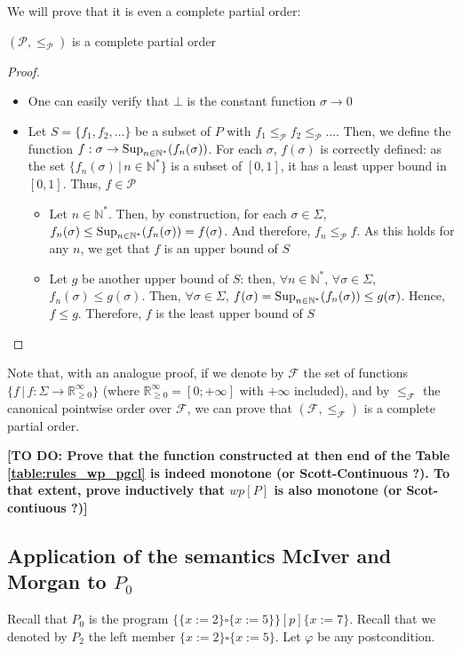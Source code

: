 \documentclass[a4paper,10pt]{llncs}
\def\NN {{\mathbb N}}
\def\RRposi {{\mathbb R_{\geq 0}^{\infty}}}
\def\Sup {\textnormal {Sup}}
\newcommand\todo[1]{{\color{red}\textbf{[TO DO:  #1]}}}
\begin{document}
We will prove that it is even a complete partial order:
\begin{theorem}
$(\mathcal{P},\leq_{\mathcal{P}})$ is a complete partial order
\end{theorem}
\begin{proof}
\begin{itemize}
\item One can easily verify that $\bot$ is the constant function $\sigma \rightarrow 0$
\item Let $S = \{f_1, f_2, \dots \}$ be a subset of $P$ with $f_1 \leq_{\mathcal{P}} f_2 \leq_{\mathcal{P}} \dots$. Then, we define the function $f : \sigma \rightarrow \Sup_{n \in \NN^*}(f_n(\sigma))$. \newline
For each $\sigma$, $f(\sigma)$ is correctly defined: as the set $\{f_n(\sigma) \,|\, n \in \NN^*\}$ is a  subset of $[0,1]$, it has a least upper bound in $[0,1]$. Thus, $f \in \mathcal{P}$
\begin{itemize}
\item Let $n \in \NN^*$. Then, by construction, for each $\sigma \in \Sigma$, $f_n(\sigma) \leq \Sup_{n \in \NN^*}(f_n(\sigma)) = f(\sigma)$. And therefore, $f_n \leq_{\mathcal{P}} f$. As this holds for any $n$, we get that $f$ is an upper bound of $S$
\item Let $g$ be another upper bound of $S$: then, $\forall n \in \NN^*$, $\forall \sigma \in \Sigma$, $f_n(\sigma) \leq g(\sigma)$. Then, $\forall \sigma \in \Sigma$, $f(\sigma) = \Sup_{n \in \NN^*}(f_n(\sigma)) \leq g(\sigma)$. Hence, $f \leq g$. Therefore, $f$ is the least upper bound of $S$
\end{itemize}
\end{itemize}
\end{proof}
 
 Note that, with an analogue proof, if we denote by $\mathcal{F}$ the set of functions $\{f \,|\, f : \Sigma \rightarrow \RRposi\}$ (where $\RRposi = [0;+\infty]$ with $+\infty$ included), and by $\leq_{\mathcal{F}}$ the canonical pointwise order over $\mathcal{F}$, we can prove that $(\mathcal{F},\leq_{\mathcal{F}})$ is a complete partial order.
 
\todo{Prove that the function constructed at then end of the Table \ref{table:rules_wp_pgcl} is indeed monotone (or Scott-Continuous ?). To that extent, prove inductively that $wp[P]$ is also monotone (or Scot-contiuous ?)}

\subsection{Application of the semantics McIver and Morgan to $P_0$}
\label{subsec:wp_p0}
Recall that $P_0$ is the program $\{ \{x := 2\} \square \{x := 5\} \} [p] \{ x := 7 \}$. Recall that we denoted by $P_2$ the left member $\{x := 2\} \square \{x := 5\}$. Let $\varphi$ be any postcondition.\bigskip
\end{document}
